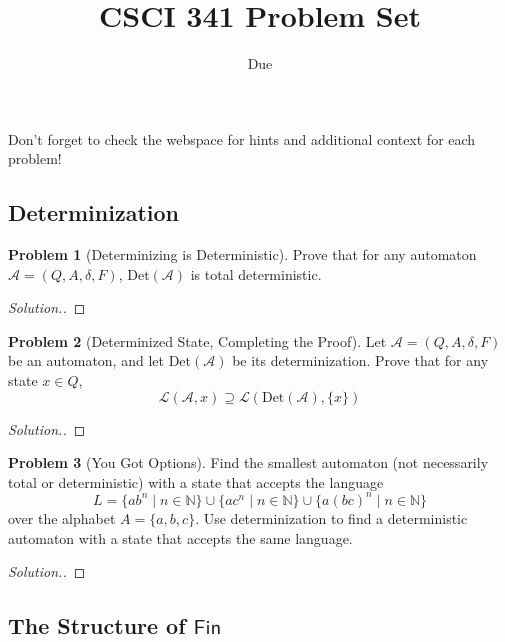 \documentclass[11pt]{article}
\title{CSCI 341 Problem Set \pset}
\author{\subtitle}
\date{Due
    \duedate
}
\theoremstyle{theorem} %
\theoremstyle{definition} %
\newtheorem{problem}                    {{\color{BurntOrange}Problem}}
\theoremstyle{remark} %
\begin{document}
\maketitle

Don't forget to check the webspace for hints and additional context for each problem!

\subsection*{Determinization}

\begin{problem}
    [Determinizing is Deterministic]
    Prove that for any automaton \(\mathcal A = (Q, A, \delta, F)\), \(\mathrm{Det}(\mathcal A)\) is total deterministic.    
\end{problem}

\begin{proof}[Solution.]
    
\end{proof}

\begin{problem}
    [Determinized State, Completing the Proof]
    Let \(\mathcal A = (Q, A, \delta, F)\) be an automaton, and let \(\mathrm{Det}(\mathcal A)\) be its determinization.
    Prove that for any state \(x \in Q\), 
    \[
        \mathcal L(\mathcal A, x) \supseteq \mathcal L(\mathrm{Det}(\mathcal A), \{x\})
    \]    
\end{problem}

\begin{proof}[Solution.]
    
\end{proof}

\begin{problem}
    [You Got Options]
    Find the smallest automaton (not necessarily total or deterministic) with a state that accepts the language 
    \[
        L = \{ab^n \mid n \in \mathbb N\} \cup \{ac^n \mid n \in \mathbb N\} \cup \{a(bc)^n \mid n \in \mathbb N\}
    \]
    over the alphabet \(A = \{a,b,c\}\).
    Use determinization to find a deterministic automaton with a state that accepts the same language.  
\end{problem}

\begin{proof}[Solution.]
    
\end{proof}

\subsection*{The Structure of \(\mathsf{Fin}\)}
\end{document}
